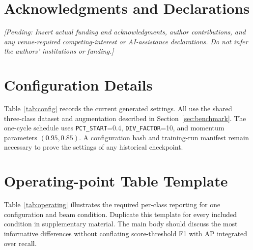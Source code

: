 \documentclass[10pt,twocolumn]{article}
\newcommand{\pending}[1]{\textcolor{blue!55!black}{\textit{[Pending: #1]}}}
\begin{document}
\section*{Acknowledgments and Declarations}
\pending{Insert actual funding and acknowledgments, author contributions, and any venue-required competing-interest or AI-assistance declarations. Do not infer the authors' institutions or funding.}

\appendix
\section{Configuration Details}
\label{app:config}
Table~\ref{tab:config} records the current generated settings. All use the shared three-class dataset and augmentation described in Section~\ref{sec:benchmark}. The one-cycle schedule uses \texttt{PCT\_START}=0.4, \texttt{DIV\_FACTOR}=10, and momentum parameters $(0.95,0.85)$. A configuration hash and training-run manifest remain necessary to prove the settings of any historical checkpoint.

\begin{table}[t]
\centering\small
\caption{Current configuration snapshot. Occupancy caps apply to both training and evaluation; max points is per input cell. NMS threshold is the configured final detector threshold, not the accuracy-matching IoU threshold.}
\label{tab:config}
\end{table}

\section{Operating-point Table Template}
\label{app:operating}
Table~\ref{tab:operating} illustrates the required per-class reporting for one configuration and beam condition. Duplicate this template for every included condition in supplementary material. The main body should discuss the most informative differences without conflating score-threshold F1 with AP integrated over recall.
\end{document}

